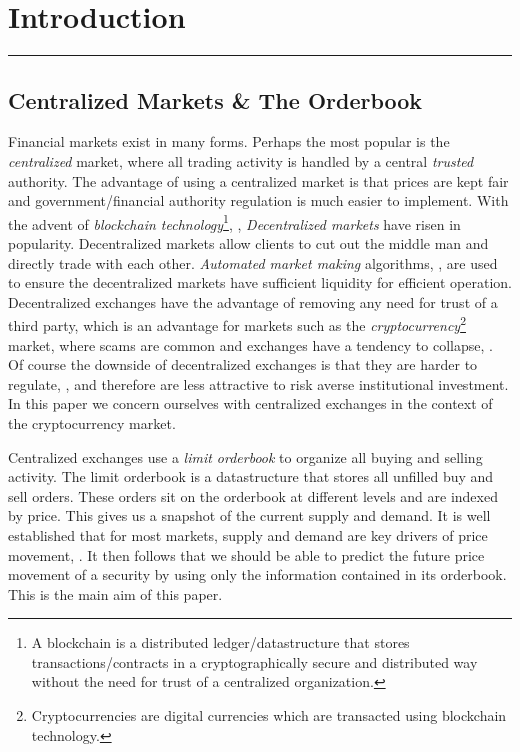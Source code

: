 \chapter{Introduction}
\hrule
\vspace{40pt}

\section{Centralized Markets \& The Orderbook}
Financial markets exist in many forms. Perhaps the most popular is the \textit{centralized} market, where all trading
activity is handled by a central \textit{trusted} authority. The advantage of using a centralized market is that prices
are kept fair and government/financial authority regulation is much easier to implement. With the advent of \textit{blockchain technology}\footnote{A blockchain is a distributed ledger/datastructure that stores transactions/contracts in a cryptographically secure and distributed way without the need for trust of a centralized organization.}, \cite{BTC2008},
\textit{Decentralized markets} have risen in popularity. Decentralized markets allow clients to cut out the middle man and directly trade with each other.
\textit{Automated market making} algorithms, \cite{ANGERIS2020}, are used to ensure the decentralized markets have sufficient liquidity for efficient operation.
Decentralized exchanges have the advantage of removing any need for trust of a third party, which is an advantage for markets such as the \textit{cryptocurrency}\footnote{Cryptocurrencies are digital currencies which are transacted using blockchain technology.} market,
where scams are common and exchanges have a tendency to collapse, \cite{FTX2024}. Of course the downside of decentralized exchanges is that they are harder to
regulate, \cite{SALAMI2021}, and therefore are less attractive to risk averse institutional investment. In this paper we concern ourselves with centralized exchanges
in the context of the cryptocurrency market.

Centralized exchanges use a \textit{limit orderbook} to organize all buying and selling activity. 
The limit orderbook is a datastructure that stores all unfilled buy and sell orders.
These orders sit on the orderbook at different levels and are indexed by price. This gives us a snapshot of the current supply and demand. It is well established that for most markets,
supply and demand are key drivers of price movement, \cite{MANKIW2014}. It then follows that we should be able to predict the future
price movement of a security by using only the information contained in its orderbook. This is the main aim of this paper.


